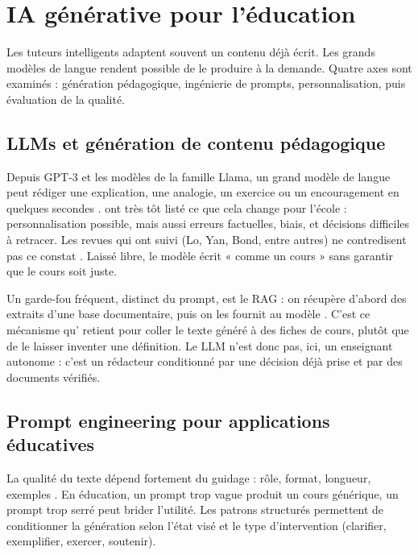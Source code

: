 \section{IA générative pour l'éducation}
\label{sec:ea-genai}

Les tuteurs intelligents adaptent souvent un
contenu déjà écrit. Les grands modèles de langue rendent possible de le produire à la demande. Quatre axes sont examinés : génération
pédagogique, ingénierie de prompts, personnalisation, puis évaluation de
la qualité.

\subsection{LLMs et génération de contenu pédagogique}

Depuis GPT-3 et les modèles de la famille Llama, un grand modèle de langue
peut rédiger une explication, une analogie, un exercice ou un encouragement
en quelques secondes
\cite{brown2020language,touvron2023llama}. \textcite{kasneci2023chatgpt} ont très tôt
listé ce que cela change pour l'école : personnalisation possible, mais aussi
erreurs factuelles, biais, et décisions difficiles à retracer. Les revues qui ont suivi (Lo, Yan, Bond, entre
autres) ne contredisent pas ce constat
\cite{lo2023chatgpt,yan2024practical,bond2024systematic}. Laissé libre, le
modèle écrit « comme un cours » sans garantir que le cours soit juste.

Un garde-fou fréquent, distinct du prompt, est le RAG : on récupère d'abord
des extraits d'une base documentaire, puis on les fournit au modèle
\cite{lewis2020retrieval}. C'est ce mécanisme qu'\emolearn{} retient pour
coller le texte généré à des fiches de cours, plutôt que de le laisser
inventer une définition. Le LLM n'est donc pas, ici, un enseignant
autonome : c'est un rédacteur conditionné par une décision déjà prise
et par des documents vérifiés.

\subsection{Prompt engineering pour applications éducatives}

La qualité du texte dépend fortement du guidage : rôle, format, longueur,
exemples \cite{liu2023pretrain,white2023prompt,wei2022chain}. En éducation,
un prompt trop vague produit un cours générique, un prompt trop serré
peut brider l'utilité. Les patrons structurés permettent de conditionner
la génération selon l'état visé et le type d'intervention (clarifier,
exemplifier, exercer, soutenir).

